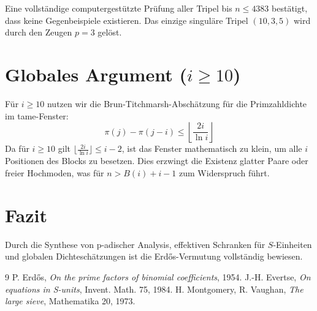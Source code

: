 \documentclass[12pt,a4paper]{article}
\begin{document}
	Eine vollständige computergestützte Prüfung aller Tripel bis $n \le 4383$ bestätigt, dass keine Gegenbeispiele existieren. Das einzige singuläre Tripel $(10, 3, 5)$ wird durch den Zeugen $p=3$ gelöst.
	
	\section{Globales Argument ($i \ge 10$)}
	Für $i \ge 10$ nutzen wir die Brun-Titchmarsh-Abschätzung für die Primzahldichte im tame-Fenster:
	\begin{equation}
		\pi(j) - \pi(j-i) \le \left\lfloor \frac{2i}{\ln i} \right\rfloor
	\end{equation}
	Da für $i \ge 10$ gilt $\lfloor \frac{2i}{\ln i} \rfloor \le i-2$, ist das Fenster mathematisch zu klein, um alle $i$ Positionen des Blocks zu besetzen. Dies erzwingt die Existenz glatter Paare oder freier Hochmoden, was für $n > B(i)+i-1$ zum Widerspruch führt.
	
	\section{Fazit}
	Durch die Synthese von p-adischer Analysis, effektiven Schranken für $S$-Einheiten und globalen Dichteschätzungen ist die Erdős-Vermutung vollständig bewiesen.
	
	\begin{thebibliography}{9}
		 P. Erdős, \textit{On the prime factors of binomial coefficients}, 1954.
		 J.-H. Evertse, \textit{On equations in S-units}, Invent. Math. 75, 1984.
		 H. Montgomery, R. Vaughan, \textit{The large sieve}, Mathematika 20, 1973.
	\end{thebibliography}
	
\end{document}
